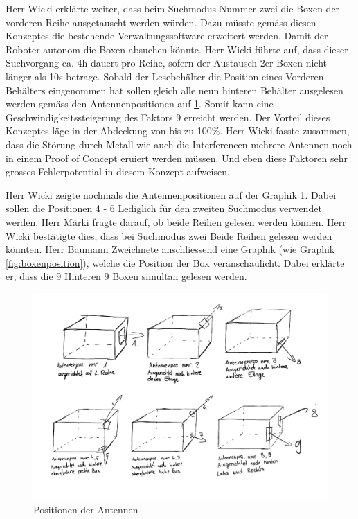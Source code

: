 \documentclass[parskip=full, a4paper]{scrreprt}
\begin{document}
Herr Wicki erklärte weiter, dass beim Suchmodus Nummer zwei die Boxen der vorderen Reihe ausgetauscht werden würden. Dazu müsste gemäss diesen Konzeptes die bestehende Verwaltungssoftware erweitert werden. Damit der Roboter autonom die Boxen absuchen könnte. Herr Wicki führte auf, dass dieser Suchvorgang ca. 4h dauert pro Reihe, sofern der Austausch 2er Boxen nicht länger als 10s betrage. Sobald der Lesebehälter die Position eines Vorderen Behälters eingenommen hat sollen gleich alle neun hinteren Behälter ausgelesen werden gemäss den Antennenpositionen auf \ref{fig:antennenpos}. Somit kann eine Geschwindigkeitssteigerung des Faktors 9 erreicht werden. Der Vorteil dieses Konzeptes läge in der Abdeckung von bis zu 100\%. Herr Wicki fasste zusammen, dass die Störung durch Metall wie auch die Interferencen mehrere Antennen noch in einem Proof of Concept eruiert werden müssen. Und eben diese Faktoren sehr grosses Fehlerpotential in diesem Konzept aufweisen.

Herr Wicki zeigte nochmals die Antennenpositionen auf der Graphik \ref{fig:antennenpos}. Dabei sollen die Positionen 4 - 6 Lediglich für den zweiten Suchmodus verwendet werden.
Herr Märki fragte darauf, ob beide Reihen gelesen werden können. Herr Wicki bestätigte dies, dass bei Suchmodus zwei Beide Reihen gelesen werden könnten.
Herr Baumann Zweichnete anschliessend eine Graphik (wie Graphik \ref{fig:boxenposition}), welche die Position der Box veranschaulicht. Dabei erklärte er, dass die 9 Hinteren 9 Boxen simultan gelesen werden.

\begin{figure}
	\centering
	\includegraphics[keepaspectratio, width=0.8\linewidth]{images/Konzept_1_Drawings3.pdf}
	\caption{Positionen der Antennen}
	\label{fig:antennenpos}
\end{figure}
\end{document}
